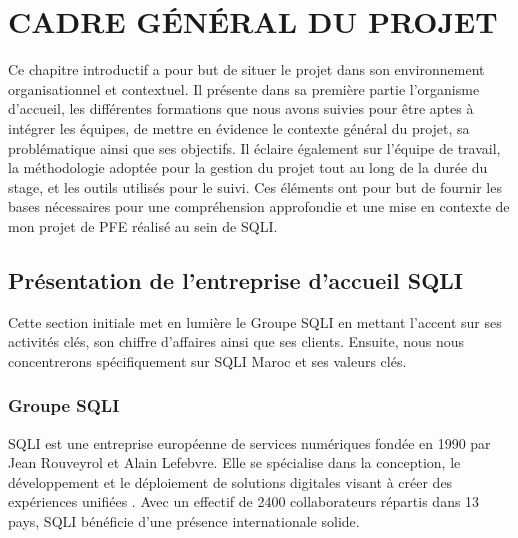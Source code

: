 
\renewcommand{\labelitemi}{\textbullet} %
\chapter{CADRE GÉNÉRAL DU PROJET}
\indent Ce chapitre introductif a pour but de situer le projet dans son environnement organisationnel et contextuel. Il présente dans sa première partie l'organisme d'accueil, les différentes formations que nous avons suivies pour être aptes à intégrer les équipes, de mettre en évidence le contexte général du projet, sa problématique ainsi que ses objectifs. Il éclaire également sur l'équipe de travail, la méthodologie adoptée pour la gestion du projet tout au long de la durée du stage, et les outils utilisés pour le suivi. Ces éléments ont pour but de fournir les bases nécessaires pour une compréhension approfondie et une mise en contexte de mon projet de PFE réalisé au sein de SQLI.

\newpage
\label{chap:premierchapitre}

\section{Présentation de l’entreprise d’accueil SQLI}
\indent Cette section initiale met en lumière le Groupe SQLI en mettant l'accent sur ses activités clés, son chiffre d'affaires ainsi que ses clients. Ensuite, nous nous concentrerons spécifiquement sur SQLI Maroc et ses valeurs clés.
\subsection{Groupe SQLI}

\indent SQLI est une entreprise européenne de services numériques fondée en 1990 par Jean Rouveyrol et Alain Lefebvre. Elle se spécialise dans la conception, le développement et le déploiement de solutions digitales visant à créer des expériences unifiées \cite{1}. Avec un effectif de 2400 collaborateurs répartis dans 13 pays, SQLI bénéficie d'une présence internationale solide.\par

